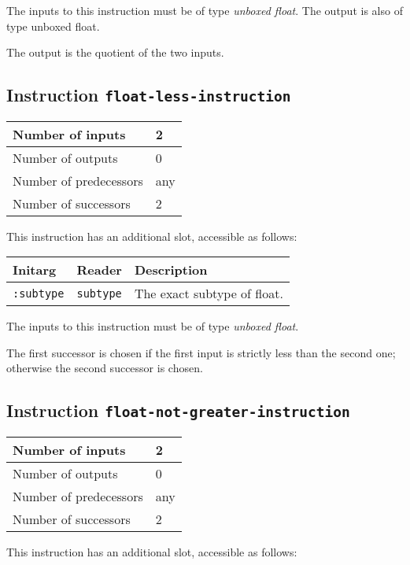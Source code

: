 The inputs to this instruction must be of type \emph{unboxed
  float}. The output is also of type unboxed float.

The output is the quotient of the two inputs.

\subsection{Instruction \texttt{float-less-instruction}}
\label{hir-instruction-float-less}

\begin{tabular}{|l|l|}
\hline
Number of inputs & 2\\
\hline
Number of outputs & 0\\
\hline
Number of predecessors & any\\
\hline
Number of successors & 2\\
\hline
\end{tabular}

This instruction has an additional slot, accessible as follows:

\begin{tabular}{|l|l|l|}
  \hline
  Initarg & Reader & Description\\
  \hline\hline
  \texttt{:subtype} & \texttt{subtype} & The exact subtype of float.\\
  \hline
\end{tabular}

The inputs to this instruction must be of type \emph{unboxed
  float}.

The first successor is chosen if the first input is strictly less than
the second one; otherwise the second successor is chosen. 

\subsection{Instruction \texttt{float-not-greater-instruction}}
\label{hir-instruction-float-not-greater}

\begin{tabular}{|l|l|}
\hline
Number of inputs & 2\\
\hline
Number of outputs & 0\\
\hline
Number of predecessors & any\\
\hline
Number of successors & 2\\
\hline
\end{tabular}

This instruction has an additional slot, accessible as follows:

